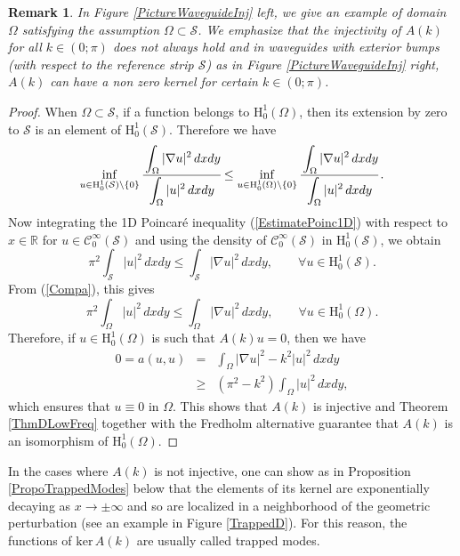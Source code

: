 \documentclass[11pt,a4paper]{report}
\newcommand{\dsp}{\displaystyle}
\newcommand{\Om}{\Omega}
\newcommand{\mrm}[1]{\mathrm{#1}}
\newcommand{\R}{\mathbb{R}}
\newcommand{\mH}{\mrm{H}}
\renewcommand{\ker}{\mrm{ker}}
\newtheorem{remark}[theorem]{Remark}
\begin{document}
\begin{remark}
In Figure \ref{PictureWaveguideInj} left, we give an example of domain $\Om$ satisfying the assumption $\Om\subset \mathcal{S}$. We emphasize that the injectivity of $A(k)$ for all $k\in(0;\pi)$ does not always hold and in waveguides with exterior bumps (with respect to the reference strip $\mathcal{S}$) as in Figure \ref{PictureWaveguideInj} right, $A(k)$ can have a non zero kernel for certain $k\in(0;\pi)$. 
\end{remark}
\begin{proof}
When $\Om\subset\mathcal{S}$, if a function belongs to $\mH^1_0(\Om)$, then its extension by zero to $\mathcal{S}$ is an element of $\mH^1_0(\mathcal{S})$. Therefore we have
\begin{equation}\label{Compa}
\inf_{u \in\mH^1_0(\mathcal{S})\setminus\{0\}} \cfrac{\dsp\int_\Om |\nabla u|^2\,dxdy}{\dsp\int_{\Om} |u|^2\,dxdy}\le \inf_{u \in\mH^1_0(\Om)\setminus\{0\}} \cfrac{\dsp\int_\Om |\nabla u|^2\,dxdy}{\dsp\int_{\Om} |u|^2\,dxdy}\,.
\end{equation}
Now integrating the 1D Poincar\'e inequality (\ref{EstimatePoinc1D}) with respect to $x\in\R$ for $u\in\mathscr{C}^\infty_0(\mathcal{S})$ and using the density of $\mathscr{C}^\infty_0(\mathcal{S})$ in $\mH^1_0(\mathcal{S})$, we obtain
\[
\pi^2\int_{\mathcal{S}}|u|^2\,dxdy \le \int_{\mathcal{S}}|\nabla u|^2\,dxdy,\qquad\forall u\in\mH^1_0(\mathcal{S}).
\]
From (\ref{Compa}), this gives 
\[
\pi^2\int_{\Om}|u|^2\,dxdy \le \int_{\Om}|\nabla u|^2\,dxdy,\qquad\forall u\in\mH^1_0(\Om).
\]
Therefore, if $u\in\mH^1_0(\Om)$ is such that $A(k)u=0$, then we have
\[
\begin{array}{rcl}
0=a(u,u)&=&\dsp\int_{\Om}|\nabla u|^2-k^2|u|^2\,dxdy \\[6pt]
&\ge & (\pi^2-k^2)\dsp\int_{\Om}|u|^2\,dxdy,
\end{array}
\]
which ensures that $u\equiv0$ in $\Om$. This shows that $A(k)$ is injective and Theorem \ref{ThmDLowFreq} together with the Fredholm alternative guarantee that $A(k)$ is an isomorphism of $\mH^1_0(\Om)$.
\end{proof}

\noindent In the cases where $A(k)$ is not injective, one can show as in Proposition \ref{PropoTrappedModes} below that the elements of its kernel are exponentially decaying as $x\to\pm\infty$ and so are localized in a neighborhood of the geometric perturbation (see an example in Figure \ref{TrappedD}). For this reason, the functions of $\ker\,A(k)$ are usually called trapped modes.
\end{document}
